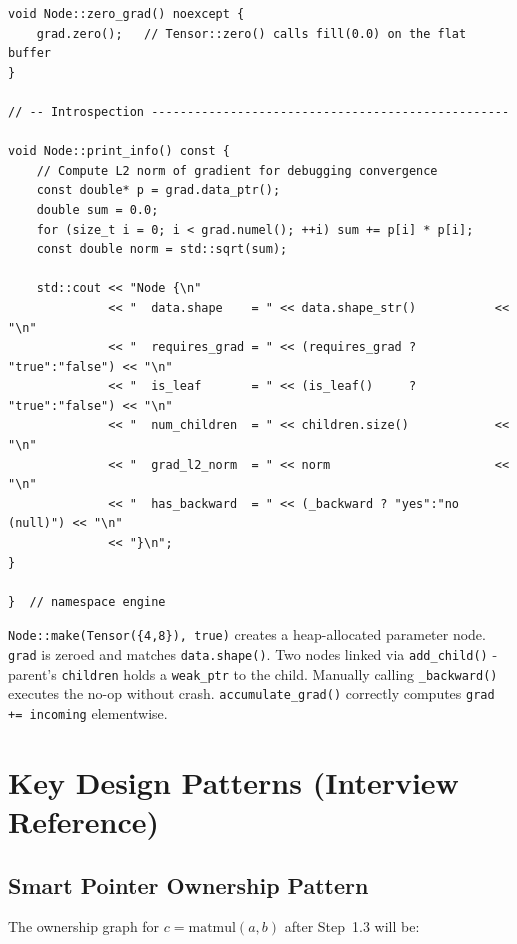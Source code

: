 \documentclass[12pt, a4paper]{article}
\begin{document}
\begin{lstlisting}[caption={\texttt{engine/node.cpp} - key implementation sections}]
void Node::zero_grad() noexcept {
    grad.zero();   // Tensor::zero() calls fill(0.0) on the flat buffer
}

// -- Introspection --------------------------------------------------

void Node::print_info() const {
    // Compute L2 norm of gradient for debugging convergence
    const double* p = grad.data_ptr();
    double sum = 0.0;
    for (size_t i = 0; i < grad.numel(); ++i) sum += p[i] * p[i];
    const double norm = std::sqrt(sum);

    std::cout << "Node {\n"
              << "  data.shape    = " << data.shape_str()           << "\n"
              << "  requires_grad = " << (requires_grad ? "true":"false") << "\n"
              << "  is_leaf       = " << (is_leaf()     ? "true":"false") << "\n"
              << "  num_children  = " << children.size()            << "\n"
              << "  grad_l2_norm  = " << norm                       << "\n"
              << "  has_backward  = " << (_backward ? "yes":"no (null)") << "\n"
              << "}\n";
}

}  // namespace engine
\end{lstlisting}

\begin{tcolorbox}[exitbox, title={Step 1.2 - Exit Criterion (met)}]
  \texttt{Node::make(Tensor(\{4,8\}), true)} creates a heap-allocated parameter
  node. \texttt{grad} is zeroed and matches \texttt{data.shape()}.
  Two nodes linked via \texttt{add\_child()} - parent's \texttt{children} holds
  a \texttt{weak\_ptr} to the child.  Manually calling \texttt{\_backward()}
  executes the no-op without crash.  \texttt{accumulate\_grad()} correctly
  computes \texttt{grad += incoming} elementwise.
\end{tcolorbox}

\newpage
\section{Key Design Patterns (Interview Reference)}

\subsection{Smart Pointer Ownership Pattern}

The ownership graph for \(c = \text{matmul}(a, b)\) after Step~1.3 will be:
\end{document}
